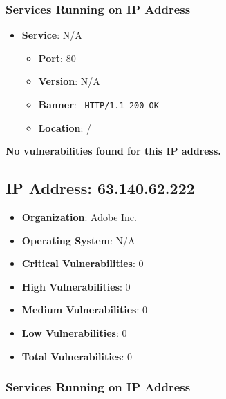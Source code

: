 \documentclass{article}
\begin{document}
\subsubsection*{Services Running on IP Address}

\begin{itemize}
    
        \item \textbf{Service}: N/A
        \begin{itemize}
            \item \textbf{Port}: 80
            \item \textbf{Version}:  N/A 
            \item \textbf{Banner}: \texttt{
                HTTP/1.1 200 OK
            }
            \item \textbf{Location}: \href{ / }{ / }
        \end{itemize}
    
\end{itemize}


\textbf{No vulnerabilities found for this IP address.}




\clearpage



\subsection*{IP Address: 63.140.62.222}

\begin{itemize}
    \item \textbf{Organization}: Adobe Inc.
    \item \textbf{Operating System}:  N/A 
    \item \textbf{Critical Vulnerabilities}: 0
    \item \textbf{High Vulnerabilities}: 0
    \item \textbf{Medium Vulnerabilities}: 0
    \item \textbf{Low Vulnerabilities}: 0
    \item \textbf{Total Vulnerabilities}: 0
\end{itemize}

\subsubsection*{Services Running on IP Address}
\end{document}
